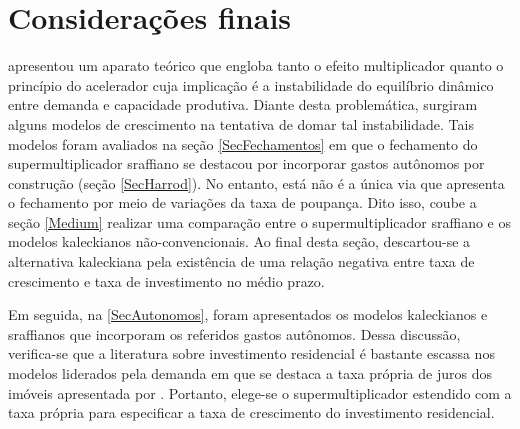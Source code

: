 \section{Considerações finais}
\label{Concl1}




\textcite{harrod_essay_1939} apresentou um aparato teórico que engloba tanto o efeito multiplicador quanto o princípio do acelerador cuja implicação é a instabilidade do equilíbrio dinâmico entre demanda e capacidade produtiva. Diante desta problemática, surgiram alguns modelos de crescimento na tentativa de domar tal instabilidade. Tais modelos foram avaliados na seção \ref{SecFechamentos} em que o fechamento do supermultiplicador sraffiano se destacou por incorporar gastos autônomos por construção (seção \ref{SecHarrod}). 
No entanto, está não é a única via que apresenta o fechamento por meio de variações da taxa de poupança.
Dito isso, coube a seção \ref{Medium} realizar uma comparação entre o supermultiplicador sraffiano e os modelos kaleckianos não-convencionais.
Ao final desta seção, descartou-se a alternativa kaleckiana pela existência de uma relação negativa entre taxa de crescimento e taxa de investimento no médio prazo.


Em seguida, na \ref{SecAutonomos},
foram apresentados os modelos kaleckianos e sraffianos que incorporam os referidos gastos autônomos.
Dessa discussão, verifica-se que a literatura sobre investimento residencial é bastante escassa nos modelos liderados pela demanda em que se destaca a taxa própria de juros dos imóveis apresentada por \textcite{teixeira_crescimento_2015}.
Portanto, elege-se o supermultiplicador estendido com a taxa própria para especificar a taxa de crescimento do investimento residencial.

